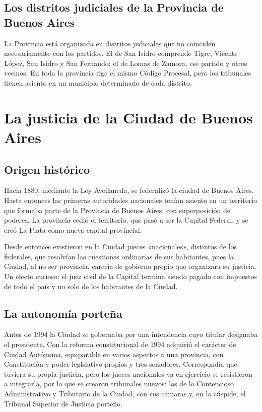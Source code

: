 \documentclass[12pt,oneside]{book}
\begin{document}
\subsection{Los distritos judiciales de la Provincia de Buenos Aires}

La Provincia está organizada en distritos judiciales que no coinciden necesariamente con los partidos. El de San Isidro comprende Tigre, Vicente López, San Isidro y San Fernando; el de Lomas de Zamora, ese partido y otros vecinos. En toda la provincia rige el mismo Código Procesal, pero los tribunales tienen asiento en un municipio determinado de cada distrito.

\section{La justicia de la Ciudad de Buenos Aires}

\subsection{Origen histórico}

\begin{nota}
Hacia 1880, mediante la Ley Avellaneda, se federalizó la ciudad de Buenos Aires. Hasta entonces las primeras autoridades nacionales tenían asiento en un territorio que formaba parte de la Provincia de Buenos Aires, con superposición de poderes. La provincia cedió el territorio, que pasó a ser la Capital Federal, y se creó La Plata como nueva capital provincial.
\end{nota}

Desde entonces existieron en la Ciudad jueces «nacionales», distintos de los federales, que resolvían las cuestiones ordinarias de sus habitantes, pues la Ciudad, al no ser provincia, carecía de gobierno propio que organizara su justicia. Un efecto curioso: el juez civil de la Capital termina siendo pagado con impuestos de todo el país y no solo de los habitantes de la Ciudad.

\subsection{La autonomía porteña}

Antes de 1994 la Ciudad se gobernaba por una intendencia cuyo titular designaba el presidente. Con la reforma constitucional de 1994 adquirió el carácter de Ciudad Autónoma, equiparable en varios aspectos a una provincia, con Constitución y poder legislativo propios y tres senadores. Correspondía que tuviera su propia justicia, pero los jueces nacionales ya en ejercicio se resistieron a integrarla, por lo que se crearon tribunales nuevos: los de lo Contencioso Administrativo y Tributario de la Ciudad, con sus cámaras y, en la cúspide, el Tribunal Superior de Justicia porteño.
\end{document}
